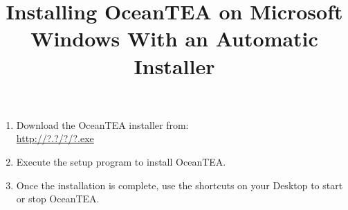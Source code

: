 \documentclass[11pt,a4paper,english,oneside,parskip=false]{scrartcl} %
\begin{document}
\title{Installing OceanTEA on Microsoft Windows With an Automatic Installer}
\date{}

\maketitle


\begin{enumerate}
	\item Download the OceanTEA installer from:\\
	\url{http://?.?/?/?.exe}
	\item Execute the setup program to install OceanTEA. 
	\item Once the installation is complete, use the shortcuts on your Desktop to start or stop OceanTEA.
\end{enumerate}
\end{document}
